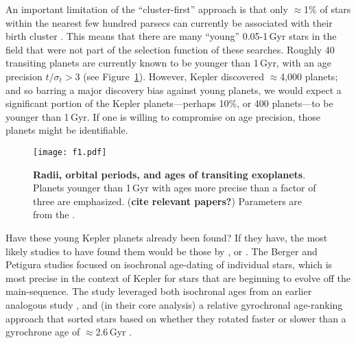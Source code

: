 \documentclass[11pt,twocolumn,tighten]{aastex63}
\begin{document}
An important limitation of the ``cluster-first'' approach is that only
$\approx$1\% of stars within the nearest few hundred parsecs can
currently be associated with their birth cluster
\citep[e.g.][]{Zari_2018,CantatGaudin_2020,Kounkel_2020,Kerr_2021}.
This means that there are many ``young'' 0.05-1\,Gyr stars in the
field that were not part of the selection function of these searches.
Roughly 40 transiting planets are currently known to be younger than
1\,Gyr, with an age precision $t/\sigma_t > 3$ (see
Figure~\ref{fig:rp_period_age}).  However, Kepler discovered
$\approx$4{,}000 planets; and so barring a major discovery bias
against young planets, we would expect a significant portion of the
Kepler planets---perhaps 10\%, or 400 planets---to be younger than
1\,Gyr.  If one is willing to compromise on age precision, those
planets might be identifiable.

\begin{figure}[!t]
	\begin{center}
		\leavevmode
		\texttt{[image: f1.pdf]}
	\end{center}
	\vspace{-0.6cm}
	\caption{
		{\bf Radii, orbital periods, and ages of transiting exoplanets}.
    Planets younger than 1\,Gyr with ages more precise than a
    factor of three are emphasized. 
    ({\bf cite relevant papers?})
    Parameters are from the \citet{PSCompPars}.
		\label{fig:rp_period_age}
	}
\end{figure}

Have these young Kepler planets already been found?  If they have, the
most likely studies to have found them would be those by
\citet{Berger_2020b_rpage}, \citet{David_2021} or
\citet{Petigura_2022}.  The Berger and Petigura studies focused on
isochronal age-dating of individual stars, which is most precise in
the context of Kepler for stars that are beginning to evolve off the
main-sequence.  The \citet{David_2021} study leveraged both isochronal
ages from an earlier analogous study
\citep{Fulton_Petigura_2018_cks_vii}, and (in their core analysis) a
relative gyrochronal age-ranking approach that sorted stars based on
whether they rotated faster or slower than a gyrochrone age of
$\approx$2.6\,Gyr \citep{Meibom_2015,Curtis_2020}.
\end{document}
